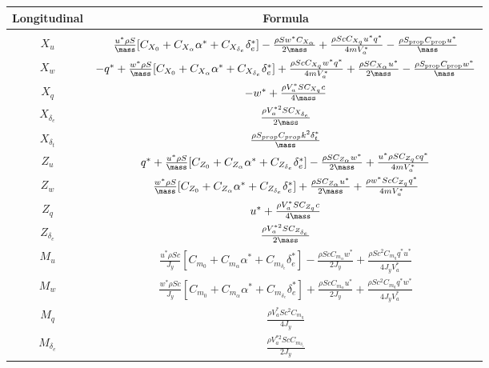 \documentclass[12pt]{article}
\begin{document}
\begin{table}[h]
\begin{center}
\begin{tabular}{cc} \toprule
Longitudinal & Formula  \\ \midrule  \hline
\\
$X_u$ &
    $\frac{u^{\ast}\rho S}{\mass} [C_{X_0}
    + C_{X_\alpha}\alpha^{\ast}
    + C_{X_{\delta_e}} \delta^{\ast}_e ]
    - \frac{\rho S w^{\ast} C_{X_{\alpha}}}{2\mass}
    + \frac{\rho S c C_{X_q} u^{\ast}q^{\ast}}{4 m V^{\ast}_a}
    - \frac{\rho S_{\text{prop}}C_{\text{prop}} u^{\ast}}{\mass}$
    \\
$X_w$ &
    $-q^{\ast}
    + \frac{w^{\ast}\rho S}{\mass}[C_{X_0} + C_{X_{\alpha}}\alpha^{\ast}
    + C_{X_{\delta_e}}\delta^{\ast}_e]
    + \frac{\rho S c C_{X_q} w^{\ast} q^{\ast}}{4 m V^{\ast}_a}
    + \frac{\rho S C_{X_{\alpha}} u^{\ast}}{2\mass}
    - \frac{\rho S_{\text{prop}}C_{\text{prop}} w^{\ast}}{\mass}$
    \\
$X_q$ &
    $-w^{\ast} + \frac{\rho V^{\ast}_a S C_{X_q}c}{4\mass}$
    \\
$X_{\delta_e}$ &
    $\frac{\rho V^{\ast 2}_a S C_{X_{\delta_e}}}{2\mass}$
    \\
$X_{\delta_t}$ &
    $\frac{\rho S_{prop} C_{prop} k^2 \delta^{\ast}_t }{\mass}$
    \\
$Z_u$ &
    $q^{\ast}
    + \frac{u^{\ast}\rho S}{\mass}[C_{Z_0} + C_{Z_{\alpha}}\alpha^{\ast}
    + C_{Z_{\delta_e}}\delta^{\ast}_e]
    - \frac{\rho S C_{Z_{\alpha}} w^{\ast}}{2\mass}
    + \frac{u^{\ast}\rho S C_{Z_q}cq^{\ast}}{4mV^{\ast}_a}$
    \\
$Z_w$ &
    $\frac{w^{\ast}\rho S}{\mass}[C_{Z_0} + C_{Z_{\alpha}}\alpha^{\ast}
    + C_{Z_{\delta_e}}\delta^{\ast}_e ]
    + \frac{\rho S C_{Z_{\alpha}} u^{\ast}}{2\mass}
    + \frac{\rho w^{\ast} S c C_{Z_q} q^{\ast}}{4mV^{\ast}_a}$
    \\
$Z_q$ &
    $u^{\ast} + \frac{\rho V^{\ast}_a S C_{Z_q} c}{4\mass}$
    \\
$Z_{\delta_e}$ &
    $\frac{\rho V^{\ast 2}_a S C_{Z_{\delta_e}}}{2\mass}$
    \\
$M_u$ &
    $\frac{u^{\ast}\rho  S c}{J_y}[ C_{m_0} + C_{m_{\alpha}}\alpha^{\ast}
    + C_{m_{\delta_e}}\delta^{\ast}_e ]
    -\frac{\rho S c C_{m_{\alpha}} w^{\ast}}{2J_y}
    + \frac{\rho S c^2 C_{m_q} q^{\ast}u^{\ast}}{4J_yV^{\ast}_a}$
    \\
$M_w$ &
    $\frac{w^{\ast}\rho S  c}{J_y}[ C_{m_0} + C_{m_{\alpha}}\alpha^{\ast}
    + C_{m_{\delta_e}}\delta^{\ast}_e ]
    +\frac{\rho S c C_{m_{\alpha}} u^{\ast}}{2J_y}
    + \frac{\rho S c^2 C_{m_q} q^{\ast}w^{\ast}}{4J_yV^{\ast}_a}$
    \\
$M_q$ &
    $\frac{\rho V^{\ast}_a S c^2 C_{m_q}}{4J_y}$
    \\
$M_{\delta_e}$ &
    $\frac{\rho V^{\ast 2}_a S c C_{m_{\delta_e}}}{2J_y}$
    \\
\bottomrule
\end{tabular}
\end{center}
\end{table}
\end{document}
